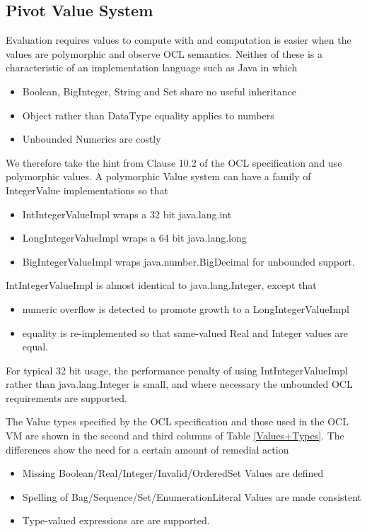 \documentclass{acm_proc_article-sp}
\begin{document}
\subsection{Pivot Value System}

Evaluation requires values to compute with and computation is easier when the values are polymorphic and observe OCL semantics. Neither of these is a characteristic of an implementation language such as Java in which 
\begin{itemize}
\item Boolean, BigInteger, String and Set share no useful inheritance
\item Object rather than DataType equality applies to numbers 
\item Unbounded Numerics are costly 
\end{itemize}

We therefore take the hint from Clause 10.2 of the OCL specification and use polymorphic values.
A polymorphic Value system can have a family of IntegerValue implementations so that
 \begin{itemize}
\item IntIntegerValueImpl wraps a 32 bit java.lang.int
\item LongIntegerValueImpl wraps a 64 bit java.lang.long 
\item BigIntegerValueImpl wraps java.number.BigDecimal for unbounded support.
\end{itemize}
IntIntegerValueImpl is almost identical to java.lang.Integer, except that 
\begin{itemize}
\item numeric overflow is detected to promote growth to a LongIntegerValueImpl
\item equality is re-implemented so that same-valued Real and Integer values are equal.
\end{itemize}
For typical 32 bit usage, the performance penalty of using IntIntegerValueImpl rather than java.lang.Integer is small, and where necessary the unbounded OCL requirements are supported.

The Value types specified by the OCL specification and those used in the OCL VM are shown in the second and third columns of Table \ref{Values+Types}. The differences show the need for a certain amount of remedial action
\begin{itemize}
\item Missing Boolean/Real/Integer/Invalid/OrderedSet Values are defined
\item Spelling of Bag/Sequence/Set/EnumerationLiteral Values are made consistent 
\item Type-valued expressions are are supported.
\end{itemize}
\end{document}
